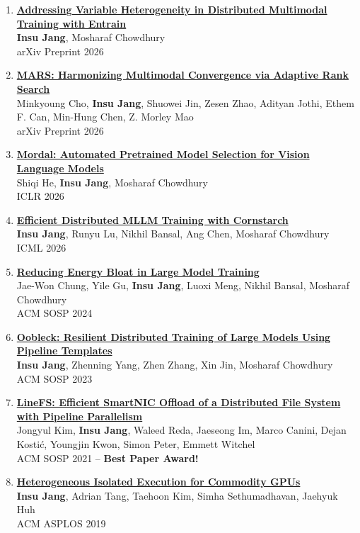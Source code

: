 \documentclass[letterpaper,oneside,11pt]{article}
\begin{document}
\begin{enumerate}[leftmargin=*]
  \item \small \href{https://arxiv.org/abs/2605.27918}{\textbf{Addressing Variable Heterogeneity in Distributed Multimodal Training with Entrain}} \\
  \textbf{Insu Jang}, Mosharaf Chowdhury \\
  arXiv Preprint 2026
  \item \small \href{https://arxiv.org/abs/2603.00720}{\textbf{MARS: Harmonizing Multimodal Convergence via Adaptive Rank Search}} \\
  Minkyoung Cho, \textbf{Insu Jang}, Shuowei Jin, Zesen Zhao, Adityan Jothi, Ethem F. Can, Min-Hung Chen, Z. Morley Mao \\
  arXiv Preprint 2026
  \item \small \href{https://openreview.net/forum?id=ZQiO12xlJq}{\textbf{Mordal: Automated Pretrained Model Selection for Vision Language Models}} \\
  Shiqi He, \textbf{Insu Jang}, Mosharaf Chowdhury \\
  ICLR 2026
  \item \small \href{https://openreview.net/forum?id=CWisSpoJF9}{\textbf{Efficient Distributed MLLM Training with Cornstarch}} \\
  \textbf{Insu Jang}, Runyu Lu, Nikhil Bansal, Ang Chen, Mosharaf Chowdhury \\
  ICML 2026
  \item \small \href{https://dl.acm.org/doi/abs/10.1145/3694715.3695970}{\textbf{Reducing Energy Bloat in Large Model Training}} \\
  Jae-Won Chung, Yile Gu, \textbf{Insu Jang}, Luoxi Meng, Nikhil Bansal, Mosharaf Chowdhury \\
  ACM SOSP 2024
  \item \small \href{https://dl.acm.org/doi/abs/10.1145/3600006.3613152}{\textbf{Oobleck: Resilient Distributed Training of Large Models Using Pipeline Templates}} \\
  \textbf{Insu Jang}, Zhenning Yang, Zhen Zhang, Xin Jin, Mosharaf Chowdhury \\
  ACM SOSP 2023
  \item \small \href{https://dl.acm.org/doi/abs/10.1145/3477132.3483565}{\textbf{LineFS: Efficient SmartNIC Offload of a Distributed File System with Pipeline Parallelism}} \\
  Jongyul Kim, \textbf{Insu Jang}, Waleed Reda, Jaeseong Im, Marco Canini, Dejan Kostić, Youngjin Kwon, Simon Peter, Emmett Witchel \\
  ACM SOSP 2021 -- \textbf{Best Paper Award!}
  \item \small \href{https://dl.acm.org/doi/abs/10.1145/3297858.3304021}{\textbf{Heterogeneous Isolated Execution for Commodity GPUs}} \\
  \textbf{Insu Jang}, Adrian Tang, Taehoon Kim, Simha Sethumadhavan, Jaehyuk Huh \\
  ACM ASPLOS 2019
\end{enumerate}
\end{document}
